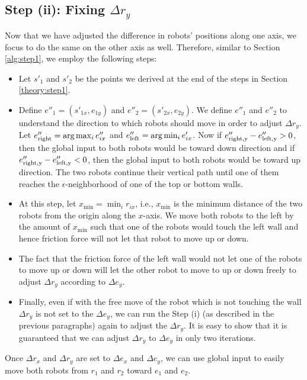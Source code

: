 \subsection{Step (ii): Fixing $\Delta r_y$}
Now that we have adjusted the difference in robots' positions along one axis, we focus to do the same on the other axis as well. Therefore, similar to Section \ref{alg:step1}, we employ the following steps:
\begin{itemize}
\item Let $s'_1$ and $s'_2$ be the points we derived at the end of the steps in Section \ref{theory:step1}. 
\item Define $e''_1=(s'_{1x},e_{1y})$ and $e''_2=(s'_{2x},e_{2y})$. We define $e''_1$ and $e''_2$ to understand the direction to which robots should move in order to adjust $\Delta r_y$. Let $e''_{\rm{right}} = \arg \max_i e''_{ix}$ and $e''_{\rm{left}} = \arg \min_i e'_{ix}$. Now if $e''_{\rm{right},y}-e''_{\rm{left},y}>0$, then the global input to both robots would be toward down direction and if $e''_{\rm{right},y}-e''_{\rm{left},y}<0$, then the global input to both robots would be toward up direction. The two robots continue their vertical path until one of them reaches the $\epsilon$-neighborhood of one of the top or bottom walls.
\item At this step, let $x_{\min} = \min_i r_{ix}$, i.e., $x_{\min}$ is the minimum distance of the two robots from the origin along the $x$-axis. We move both robots to the left by the amount of $x_{\min}$ such that one of the robots would touch the left wall and hence friction force will not let that robot to move up or down.
\item The fact that the friction force of the left wall would not let one of the robots to move up or down will let the other robot to move to up or down freely to adjust $\Delta r_y $ according to $\Delta e_y$.
\item Finally, even if with the free move of the robot which is not touching the wall  $\Delta r_y$ is not set to the $\Delta e_y$, we can run the Step (i) (as described in the previous paragraphs) again to adjust the $\Delta r_y$. It is easy to show that it is guaranteed that we can adjust $\Delta r_y$ to $\Delta e_y$ in only two iterations.
\end{itemize}
Once $\Delta r_x$ and $\Delta r_y$ are set to $\Delta e_x$ and $\Delta e_y$, we can use global input to easily move both robots from $r_1$ and $r_2$ toward $e_1$ and $e_2$. 


